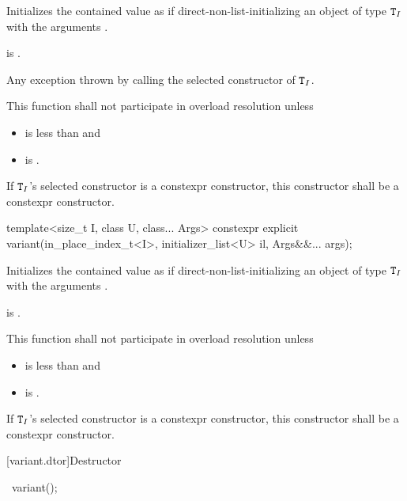 \begin{itemdescr}
\pnum
\effects
Initializes the contained value as if direct-non-list-initializing
an object of type $\texttt{T}_I$
with the arguments .

\pnum
\postconditions
{} is .

\pnum
\throws
Any exception thrown by calling the selected constructor of $\texttt{T}_I$.

\pnum
\remarks
This function shall not participate in overload resolution unless
\begin{itemize}
\item
{} is less than  and
\item
{} is .
\end{itemize}
If $\texttt{T}_I$'s selected constructor is a constexpr constructor, this
constructor shall be a constexpr constructor.
\end{itemdescr}

%
\begin{itemdecl}
template<size_t I, class U, class... Args>
  constexpr explicit variant(in_place_index_t<I>, initializer_list<U> il, Args&&... args);
\end{itemdecl}

\begin{itemdescr}
\pnum
\effects
Initializes the contained value as if direct-non-list-initializing
an object of type $\texttt{T}_I$
with the arguments .

\pnum
\postconditions
{} is .

\pnum
\remarks
This function shall not participate in overload resolution unless
\begin{itemize}
\item
{} is less than  and
\item
{} is .
\end{itemize}
If $\texttt{T}_I$'s selected constructor is a constexpr constructor, this
constructor shall be a constexpr constructor.
\end{itemdescr}

[variant.dtor]{Destructor}

%
\begin{itemdecl}
~variant();
\end{itemdecl}

